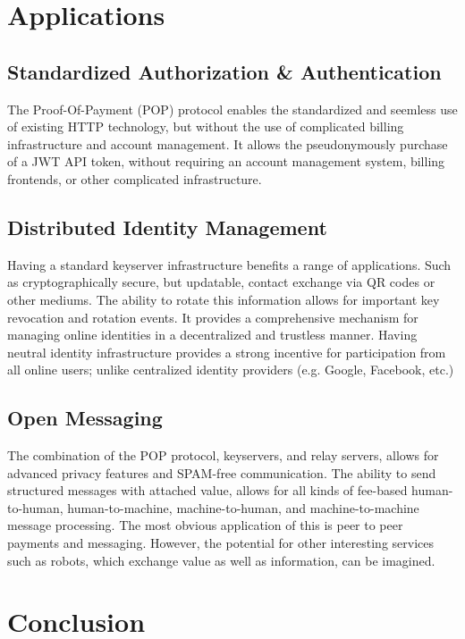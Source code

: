 \documentclass{article}
\begin{document}
\section{Applications}

\subsection{Standardized Authorization \& Authentication}

The Proof-Of-Payment (POP) protocol enables the standardized and seemless use of existing HTTP technology, but without the use of complicated billing infrastructure and account management. It allows the pseudonymously purchase of a JWT API token, without requiring an account management system, billing frontends, or other complicated infrastructure.

\subsection{Distributed Identity Management}

Having a standard keyserver infrastructure benefits a range of applications. Such as cryptographically secure, but updatable, contact exchange via QR codes or other mediums. The ability to rotate this information allows for important key revocation and rotation events. It provides a comprehensive mechanism for managing online identities in a decentralized and trustless manner. Having neutral identity infrastructure provides a strong incentive for participation from all online users; unlike centralized identity providers (e.g. Google, Facebook, etc.)

\subsection{Open Messaging}

The combination of the POP protocol, keyservers, and relay servers, allows for advanced privacy features and SPAM-free communication. The ability to send structured messages with attached value, allows for all kinds of fee-based human-to-human, human-to-machine, machine-to-human, and machine-to-machine message processing. The most obvious application of this is peer to peer payments and messaging. However, the potential for other interesting services such as robots, which exchange value as well as information, can be imagined.

\section{Conclusion}
\end{document}
